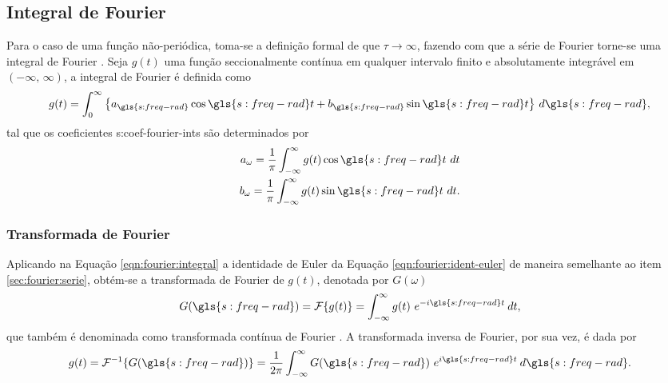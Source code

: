 \documentclass[12pt,oneside,english,brazil,lmodern,siglas,simbolos,cite=num]{ucsmonograph}
\begin{document}
	\subsection{Integral de Fourier}
	Para o caso de uma função não-periódica, toma-se a definição formal de que $ \tau\to\infty $, fazendo com que a série de Fourier torne-se uma integral de Fourier \cite{spiegel:1977}.
	Seja $g(t)$ uma função seccionalmente contínua em qualquer intervalo finito e absolutamente integrável em $ (-\infty ,\,\infty) $, a integral de Fourier é definida como \cite{spiegel:1977}
	\begin{equation}\label{eqn:fourier:integral}
		g(t) = \int_{0}^{\infty}\left\lbrace a_{\gls{s:freq-rad}}\cos\gls{s:freq-rad} t + b_{\gls{s:freq-rad}}\sin\gls{s:freq-rad} t\right\rbrace\, d\gls{s:freq-rad},
	\end{equation}
	tal que os coeficientes \glspl{s:coef-fourier-int} são determinados por
	\setlength{}
	\begin{align}
		a_\omega = \frac{1}{\pi}\int_{-\infty}^{\infty}g(t)\cos\gls{s:freq-rad} t\ dt \\
		b_\omega = \frac{1}{\pi}\int_{-\infty}^{\infty}g(t)\sin\gls{s:freq-rad} t\ dt.
	\end{align}
	
	\subsubsection{Transformada de Fourier} \label{sec:fourier:transform}
	Aplicando na Equação \ref{eqn:fourier:integral} a identidade de Euler da Equação \ref{eqn:fourier:ident-euler} de maneira semelhante ao item \ref{sec:fourier:serie}, obtém-se a transformada de Fourier \cite{savi:2017} de $g(t)$, denotada por $G(\omega)$
	\begin{equation} \label{eqn:fourier:transform}
		G(\gls{s:freq-rad}) = \mathcal{F}\{g(t)\} = \int_{-\infty}^{\infty}g(t)\ e^{-i\gls{s:freq-rad} t}\:dt,
	\end{equation}
	que também é denominada como transformada contínua de Fourier \cite{dimarogonas:1995}.
	A transformada inversa de Fourier, por sua vez, é dada por \cite{spiegel:1977}
	\begin{equation} \label{eqn:fourier:transform-inv}
		g(t) = \mathcal{F}^{-1}\{G(\gls{s:freq-rad})\} = \frac{1}{2\pi}\int_{-\infty}^{\infty}G(\gls{s:freq-rad})\ e^{i\gls{s:freq-rad} t}\:d\gls{s:freq-rad}.
	\end{equation}
	
\end{document}
